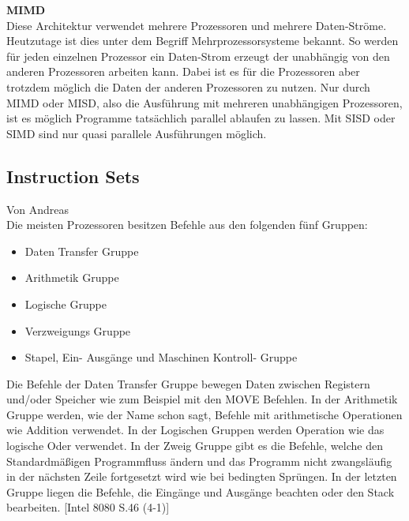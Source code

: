\documentclass[12pt]{article}
\begin{document}
\noindent
\textbf{MIMD}\\
Diese Architektur verwendet mehrere Prozessoren und mehrere Daten-Ströme. Heutzutage ist dies unter dem Begriff Mehrprozessorsysteme bekannt. So werden für jeden einzelnen Prozessor ein Daten-Strom erzeugt der unabhängig von den anderen Prozessoren arbeiten kann. Dabei ist es für die Prozessoren aber trotzdem möglich die Daten der anderen Prozessoren zu nutzen. Nur durch MIMD oder MISD, also die Ausführung mit mehreren unabhängigen Prozessoren, ist es möglich Programme tatsächlich parallel ablaufen zu lassen. Mit SISD oder SIMD sind nur quasi parallele Ausführungen möglich.\\

\subsection{Instruction Sets}
Von Andreas\\
Die meisten Prozessoren besitzen Befehle aus den folgenden fünf Gruppen:

\begin{itemize}
\item Daten Transfer Gruppe
\item Arithmetik Gruppe
\item Logische Gruppe
\item Verzweigungs Gruppe
\item Stapel, Ein- Ausgänge und Maschinen Kontroll- Gruppe
\end{itemize}

\noindent
Die Befehle der Daten Transfer Gruppe bewegen Daten zwischen Registern und/oder Speicher wie zum Beispiel mit den MOVE Befehlen. In der Arithmetik Gruppe werden, wie der Name schon sagt, Befehle mit arithmetische Operationen wie Addition verwendet. In der Logischen Gruppen werden Operation wie das logische Oder verwendet. In der Zweig Gruppe gibt es die Befehle, welche den Standardmäßigen Programmfluss ändern und das Programm nicht zwangsläufig in der nächsten Zeile fortgesetzt wird wie bei bedingten Sprüngen. In der letzten Gruppe liegen die Befehle, die Eingänge und Ausgänge beachten oder den Stack bearbeiten. [Intel 8080 S.46 (4-1)]
\\

\newpage
\end{document}
